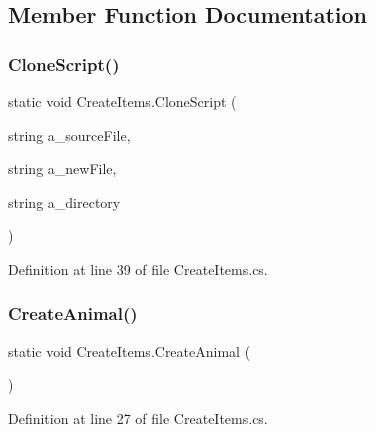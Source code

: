 \subsection{Member Function Documentation}
\mbox{\label{class_create_items_a046eeb575a0946230f48a9c8da08f798}} 
\subsubsection{\texorpdfstring{Clone\+Script()}{CloneScript()}}
{\footnotesize\ttfamily static void Create\+Items.\+Clone\+Script (\begin{DoxyParamCaption}\item[{string}]{a\+\_\+source\+File,  }\item[{string}]{a\+\_\+new\+File,  }\item[{string}]{a\+\_\+directory }\end{DoxyParamCaption})\hspace{0.3cm}{\ttfamily [static]}}



Definition at line 39 of file Create\+Items.\+cs.

\mbox{\label{class_create_items_aa1e66423bdf3a3da33f8b7d8b32cc7b9}} 
\subsubsection{\texorpdfstring{Create\+Animal()}{CreateAnimal()}}
{\footnotesize\ttfamily static void Create\+Items.\+Create\+Animal (\begin{DoxyParamCaption}{ }\end{DoxyParamCaption})\hspace{0.3cm}{\ttfamily [static]}}



Definition at line 27 of file Create\+Items.\+cs.

\mbox{\label{class_create_items_a860a974651471d89a5b9f72bc00fd4b6}} 
